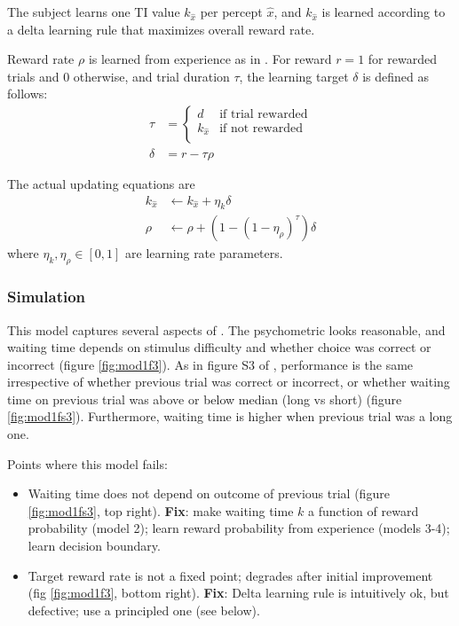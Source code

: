 The subject learns one TI value $k_{\hat{x}}$ per percept $\hat{x}$, and $k_{\hat{x}}$ is learned according to a delta learning rule that maximizes overall reward rate.

Reward rate $\rho$ is learned from experience as in \cite{constantino2015learning}.
For reward $r=1$ for rewarded trials and $0$ otherwise, and trial duration $\tau$, the learning target $\delta$ is defined as follows:
\begin{align}
\tau &=
\begin{cases}
d & \text{if trial rewarded} \\
k_{\hat{x}} & \text{if not rewarded}\\
\end{cases}\\
\delta &= r - \tau \rho
\nonumber
\end{align}

The actual updating equations are
\begin{align}
    k_{\hat{x}} &\leftarrow k_{\hat{x}} + \eta_k \delta \\
    \rho &\leftarrow \rho + (1-(1-\eta_\rho)^\tau) \delta
\end{align}
where $\eta_k, \eta_\rho \in [0,1]$ are learning rate parameters.

\subsubsection{Simulation}

This model captures several aspects of \cite{lak2014orbitofrontal}.
The psychometric looks reasonable, and waiting time depends on stimulus difficulty and whether choice was correct or incorrect (figure \ref{fig:mod1f3}).
As in figure S3 of \cite{lak2014orbitofrontal}, performance is the same irrespective of whether previous trial was correct or incorrect, or whether waiting time on previous trial was above or below median (long vs short) (figure \ref{fig:mod1fs3}).
Furthermore, waiting time is higher when previous trial was a long one.

Points where this model fails:
\begin{itemize}
    \item Waiting time does not depend on outcome of previous trial (figure \ref{fig:mod1fs3}, top right). \textbf{Fix}: make waiting time $k$ a function of reward probability (model 2); learn reward probability from experience (models 3-4); learn decision boundary.
    \item Target reward rate is not a fixed point; degrades after initial improvement (fig \ref{fig:mod1f3}, bottom right). \textbf{Fix}: Delta learning rule is intuitively ok, but defective; use a principled one (see below).
\end{itemize}

